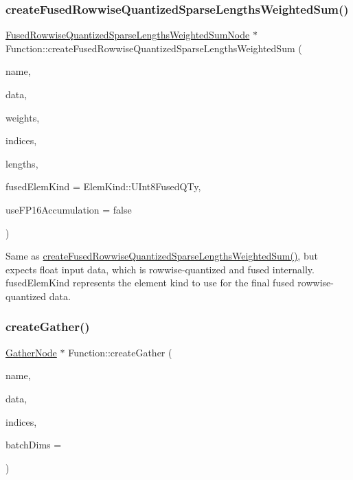 \subsubsection{\texorpdfstring{create\+Fused\+Rowwise\+Quantized\+Sparse\+Lengths\+Weighted\+Sum()}{createFusedRowwiseQuantizedSparseLengthsWeightedSum()}\hspace{0.1cm}{\footnotesize\ttfamily [2/2]}}
{\footnotesize\ttfamily \hyperlink{classglow_1_1_fused_rowwise_quantized_sparse_lengths_weighted_sum_node}{Fused\+Rowwise\+Quantized\+Sparse\+Lengths\+Weighted\+Sum\+Node} $\ast$ Function\+::create\+Fused\+Rowwise\+Quantized\+Sparse\+Lengths\+Weighted\+Sum (\begin{DoxyParamCaption}\item[{llvm\+::\+String\+Ref}]{name,  }\item[{\hyperlink{classglow_1_1_tensor}{Tensor} \&}]{data,  }\item[{\hyperlink{structglow_1_1_node_value}{Node\+Value}}]{weights,  }\item[{\hyperlink{structglow_1_1_node_value}{Node\+Value}}]{indices,  }\item[{\hyperlink{structglow_1_1_node_value}{Node\+Value}}]{lengths,  }\item[{\hyperlink{namespaceglow_ab92e14a94329daf4083db670e95fbcdf}{Elem\+Kind}}]{fused\+Elem\+Kind = {\ttfamily ElemKind\+:\+:UInt8FusedQTy},  }\item[{bool}]{use\+F\+P16\+Accumulation = {\ttfamily false} }\end{DoxyParamCaption})}

Same as \hyperlink{classglow_1_1_function_acc35291a608ce9d7aa2806ed50fa1e1b}{create\+Fused\+Rowwise\+Quantized\+Sparse\+Lengths\+Weighted\+Sum()}, but expects float input {\ttfamily data}, which is rowwise-\/quantized and fused internally. {\ttfamily fused\+Elem\+Kind} represents the element kind to use for the final fused rowwise-\/quantized data. \mbox{\label{classglow_1_1_function_a5dedd74fc1b4538ad12cd60d43339dc8}} 
\subsubsection{\texorpdfstring{create\+Gather()}{createGather()}}
{\footnotesize\ttfamily \hyperlink{classglow_1_1_gather_node}{Gather\+Node} $\ast$ Function\+::create\+Gather (\begin{DoxyParamCaption}\item[{llvm\+::\+String\+Ref}]{name,  }\item[{\hyperlink{structglow_1_1_node_value}{Node\+Value}}]{data,  }\item[{\hyperlink{structglow_1_1_node_value}{Node\+Value}}]{indices,  }\item[{\hyperlink{namespaceglow_a0ca574644e1e42ef193a9947fb4d8911}{unsigned\+\_\+t}}]{batch\+Dims = {} }\end{DoxyParamCaption})}

